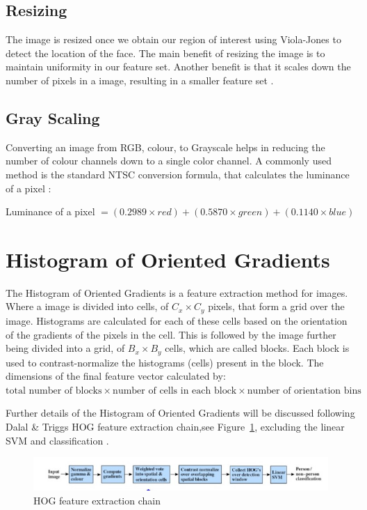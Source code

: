 	\subsection{Resizing} 
	The image is resized once we obtain our region of interest using Viola-Jones to detect the location of the face. The main benefit of resizing the image is to maintain uniformity in our feature set. Another benefit is that it scales down the number of pixels in a image, resulting in a smaller feature set \cite{pre}. 
	\subsection{Gray Scaling}
	Converting an image from RGB, colour, to Grayscale helps in reducing the number of colour channels down to a single color channel. A commonly used method is the standard NTSC conversion formula, that calculates the luminance of a pixel \cite{pre}:

	Luminance of a pixel $= (0.2989 \times red) + (0.5870 \times green) + (0.1140 \times blue) $
	 
\section{Histogram of Oriented Gradients}   
The Histogram of Oriented Gradients is a feature extraction method for images. Where a image is divided into cells, of $C_x \times C_y$ pixels, that form a grid over the image. Histograms are calculated for each of these cells based on the orientation of the gradients of the pixels in the cell. This is followed by the image further being divided into a grid, of $B_x \times B_y$ cells, which are called blocks. Each block is used to contrast-normalize the histograms (cells) present in the block. The dimensions of the final feature vector calculated by: 
\newline
$\textrm{total number of blocks} \times \textrm{number of cells in each block} \times \textrm{number of orientation bins}$
\begin{flushleft}
Further details of the Histogram of Oriented Gradients will be discussed following Dalal \& Triggs HOG feature extraction chain,see Figure~\ref{fig:hhog}, excluding the linear SVM and classification \cite{hog}.
\end{flushleft}
\begin{figure}[H]
  \centering
  \includegraphics[scale=0.65]{chain}
  \caption{HOG feature extraction chain \cite{hog}}
  \label{fig:hhog}
\end{figure}

